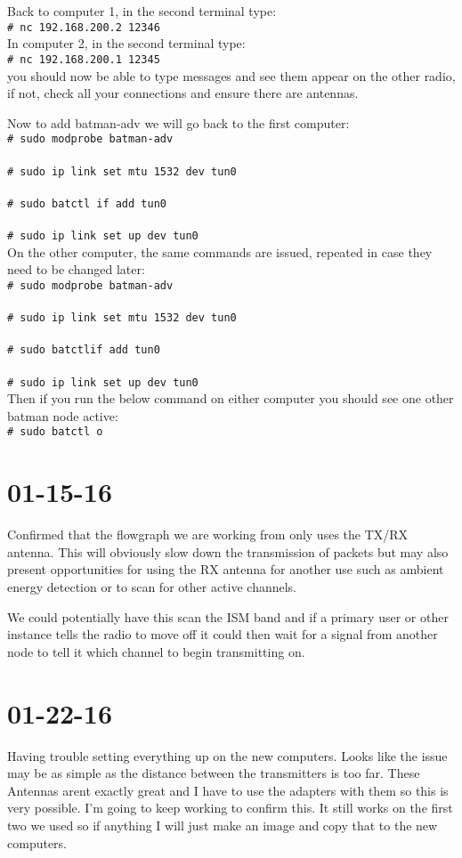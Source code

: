 \documentclass{article}
\newcommand{\shellcmd}[1]{\\\indent\indent\texttt{\footnotesize\# #1}\\}
\begin{document}
{	Back to computer 1, in the second terminal type:
	\shellcmd{nc 192.168.200.2 12346}

	In computer 2, in the second terminal type:
	\shellcmd{nc 192.168.200.1 12345}

	you should now be able to type messages and see them appear on the other radio, if not, check all your connections and ensure there are antennas. 

	Now to add batman-adv we will go back to the first computer:
	\shellcmd{sudo modprobe batman-adv}
	\shellcmd{sudo ip link set mtu 1532 dev tun0}
	\shellcmd{sudo batctl if add tun0}
	\shellcmd{sudo ip link set up dev tun0}

	On the other computer, the same commands are issued, repeated in case they need to be changed later:
	\shellcmd{sudo modprobe batman-adv}
	\shellcmd{sudo ip link set mtu 1532 dev tun0}
	\shellcmd{sudo batctlif add tun0}
	\shellcmd{sudo ip link set up dev tun0}

	Then if you run the below command on either computer you should see one other batman node active:
	\shellcmd{sudo batctl o}

	\section{01-15-16}
		
	Confirmed that the flowgraph we are working from only uses the TX/RX antenna. This will obviously slow down the transmission of packets but may also present opportunities for using
	the RX antenna for another use such as ambient energy detection or to scan for other active channels. 

	We could potentially have this scan the ISM band and if a primary user or other instance tells the radio to move off it could then wait for a signal from another node to tell it
	which channel to begin transmitting on. 
	
	\section{01-22-16}

	Having trouble setting everything up on the new computers. Looks like the issue may be as simple as the distance between the transmitters is too far. These Antennas arent exactly great and I
	have to use the adapters with them so this is very possible. I'm going to keep working to confirm this. It still works on the first two we used so if anything I will just make an image and copy
	that to the new computers.

}
\end{document}
